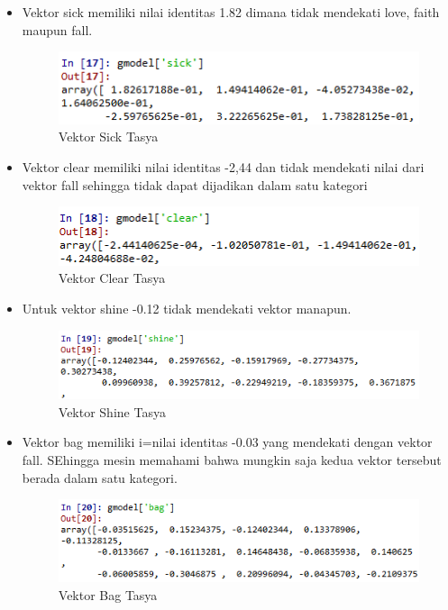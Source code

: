 \begin{itemize}
\item  Vektor sick memiliki nilai identitas 1.82 dimana tidak mendekati love, faith maupun fall.
\begin{figure}[ht]
\centering
\includegraphics[scale=0.5]{figures/chapter5tasya7.png}
\caption{Vektor Sick Tasya}
\label{Praktek}
\end{figure}


\item Vektor clear memiliki nilai identitas -2,44 dan tidak mendekati nilai dari vektor fall sehingga tidak dapat dijadikan dalam satu kategori
\begin{figure}[ht]
\centering
\includegraphics[scale=0.3]{figures/chapter5tasya8.png}
\caption{Vektor Clear Tasya}
\label{Praktek}
\end{figure}

\item Untuk vektor shine -0.12 tidak mendekati vektor manapun.
\begin{figure}[ht]
\centering
\includegraphics[scale=0.3]{figures/chapter5tasya9.png}
\caption{Vektor Shine Tasya}
\label{Praktek}
\end{figure}


\item Vektor bag memiliki i=nilai identitas -0.03 yang mendekati dengan vektor fall. SEhingga mesin memahami bahwa mungkin saja kedua vektor tersebut berada dalam satu kategori.
\begin{figure}[ht]
\centering
\includegraphics[scale=0.3]{figures/chapter5tasya10.png}
\caption{Vektor Bag Tasya}
\label{Praktek}
\end{figure}



\end{itemize}
